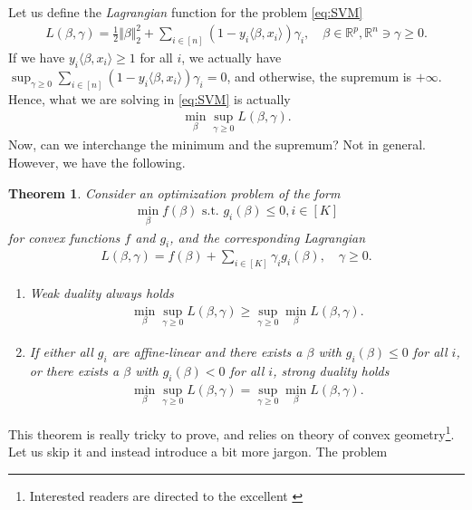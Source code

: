 \documentclass{article}
\newcommand{\sprod}[1]{\langle #1 \rangle}
\newcommand{\R}{\mathbb{R}}
\newtheorem{theorem}{Theorem}
\newcommand{\norm}[1]{\Vert #1 \Vert}
\begin{document}
Let us define the  \emph{Lagrangian} function for the problem \eqref{eq:SVM}
\begin{align*}
    L(\beta, \gamma) = \tfrac{1}{2}\norm{\beta}_2^2 + \sum_{i\in [n]}(1-y_i\sprod{\beta,x_i})\gamma_i, \quad \beta \in \R^p, \R^n \ni \gamma \geq 0.
\end{align*}
If we have $y_i\sprod{\beta,x_i}\geq 1$ for all $i$, we actually have $\sup_{\gamma \geq 0} \sum_{i\in [n]}(1-y_i\sprod{\beta,x_i})\gamma_i =0$, and otherwise, the supremum is $+\infty$. Hence, what we are solving in \eqref{eq:SVM} is actually
\begin{align*}
    \min_{\beta}\sup_{\gamma\geq 0} L(\beta,\gamma).
\end{align*}
Now, can we interchange the minimum and the supremum? Not in general. However, we have the following.
\begin{theorem}
    Consider an optimization problem of the form
    \begin{align*}
        \min_{\beta} f(\beta) \text{ s.t. } g_i(\beta) \leq 0, i\in [K]
    \end{align*}
    for convex functions $f$ and $g_i$, and the corresponding Lagrangian
    \begin{align*}
        L(\beta,\gamma) = f(\beta) + \sum_{i \in [K]}\gamma_i g_i(\beta), \quad  \gamma \geq 0.
    \end{align*}
    \begin{enumerate}
        \item \emph{Weak duality} always holds
        \begin{align*}
            \min_\beta \sup_{\gamma \geq 0} L(\beta,\gamma) \geq \sup_{\gamma\geq 0 }\min_{\beta} L(\beta,\gamma).
        \end{align*}
        \item If either all $g_i$ are affine-linear and there exists a $\beta$ with $g_i(\beta)\leq 0$ for all $i$, \emph{or} there exists a $\beta$ with $g_i(\beta)<0$ for all $i$, \emph{strong duality} holds
        \begin{align*}
            \min_\beta \sup_{\gamma \geq 0} L(\beta,\gamma) = \sup_{\gamma\geq 0}\min_{\beta} L(\beta,\gamma).
        \end{align*}
    \end{enumerate}
\end{theorem}
This theorem is really tricky to prove, and relies on theory of convex geometry\footnote{Interested readers are directed to the excellent \cite{boyd2004convex}}. Let us skip it and instead introduce a bit more jargon. The  problem
\end{document}
